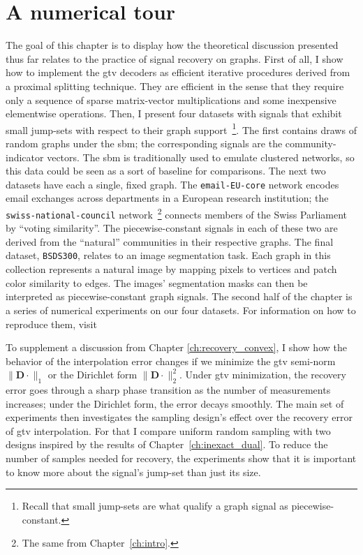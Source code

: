 \chapter{A numerical tour}\label{ch:numerical_tour}

The goal of this chapter is to display how the theoretical discussion presented thus far relates to the practice of signal recovery on graphs. First of all, I show how to implement the \acrfull{gtv} decoders as efficient iterative procedures derived from a proximal splitting technique. They are efficient in the sense that they require only a sequence of sparse matrix-vector multiplications and some inexpensive elementwise operations. Then, I present four datasets with signals that exhibit small jump-sets with respect to their graph support~\footnote{Recall that small jump-sets are what qualify a graph signal as piecewise-constant.}. The first contains draws of random graphs under the \acrfull{sbm}; the corresponding signals are the community-indicator vectors. The \acrshort{sbm} is traditionally used to emulate clustered networks, so this data could be seen as a sort of baseline for comparisons. The next two datasets have each a single, fixed graph. The \texttt{email-EU-core} network encodes email exchanges across departments in a European research institution; the \texttt{swiss-national-council} network~\footnote{The same from Chapter~\ref{ch:intro}.} connects members of the Swiss Parliament by ``voting similarity''. The piecewise-constant signals in each of these two are derived from the ``natural'' communities in their respective graphs. The final dataset, \texttt{BSDS300}, relates to an image segmentation task. Each graph in this collection represents a natural image by mapping pixels to vertices and patch color similarity to edges. The images' segmentation masks can then be interpreted as piecewise-constant graph signals. The second half of the chapter is a series of numerical experiments on our four datasets. For information on how to reproduce them, visit
\begin{center}
\end{center}
To supplement a discussion from Chapter \ref{ch:recovery_convex}, I show how the behavior of the interpolation error changes if we minimize the \acrshort{gtv} semi-norm $\|\mathbf{D} \cdot\|_1$ or the Dirichlet form $\|\mathbf{D} \cdot\|_2^2$. Under \acrshort{gtv} minimization, the recovery error goes through a sharp phase transition as the number of measurements increases; under the Dirichlet form, the error decays smoothly. The main set of experiments then investigates the sampling design's effect over the recovery error of \acrshort{gtv} interpolation. For that I compare uniform random sampling with two designs inspired by the results of Chapter~\ref{ch:inexact_dual}. To reduce the number of samples needed for recovery, the experiments show that it is important to know more about the signal's jump-set than just its size.


